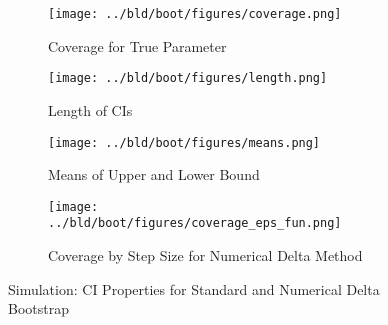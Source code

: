 \documentclass[11pt,a4paper,english]{article} %
\numberwithin{equation}{section}
\numberwithin{figure}{section}
\numberwithin{table}{section}
\theoremstyle{definition}
\theoremstyle{remark}
\begin{document}
\begin{figure}
	\centering
	\begin{subfigure}{0.45\textwidth}
		\centering
		\texttt{[image: ../bld/boot/figures/coverage.png]}
		\caption{Coverage for True Parameter}
	\end{subfigure}
	\hfill
	\begin{subfigure}{0.45\textwidth}
		\centering
		\texttt{[image: ../bld/boot/figures/length.png]}
		\caption{Length of CIs}
	\end{subfigure}

	\begin{subfigure}{0.45\textwidth}
		\centering
		\texttt{[image: ../bld/boot/figures/means.png]}
		\caption{Means of Upper and Lower Bound}
	\end{subfigure}
	\hfill
	\begin{subfigure}{0.45\textwidth}
		\centering
		\texttt{[image: ../bld/boot/figures/coverage\_eps\_fun.png]}
		\caption{Coverage by Step Size for Numerical Delta Method}
	\end{subfigure}
	\caption{Simulation: CI Properties for Standard and Numerical Delta Bootstrap}\label{fig:simulation_ci_bootstrap}
\end{figure}



\end{document}
